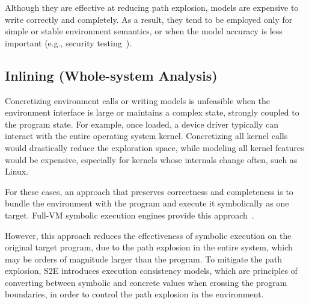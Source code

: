 Although they are effective at reducing path explosion, models are expensive to write correctly and completely.  As a result, they tend to be employed only for simple or stable environment semantics, or when the model accuracy is less important (e.g., security testing~\cite{aeg}).


\subsection{Inlining (Whole-system Analysis)}

Concretizing environment calls or writing models is unfeasible when the environment interface is large or maintains a complex state, strongly coupled to the program state.
%
For example, once loaded, a device driver typically can interact with the entire operating system kernel.  Concretizing all kernel calls would drastically reduce the exploration space, while modeling all kernel features would be expensive, especially for kernels whose internals change often, such as Linux.

For these cases, an approach that preserves correctness and completeness is to bundle the environment with the program and execute it symbolically as one target.
%
Full-VM symbolic execution engines provide this approach~\cite{s2e,bitBlaze}.

However, this approach reduces the effectiveness of symbolic execution on the original target program, due to the path explosion in the entire system, which may be orders of magnitude larger than the program.
%
To mitigate the path explosion, S2E introduces execution consistency models, which are principles of converting between symbolic and concrete values when crossing the program boundaries, in order to control the path explosion in the environment.



